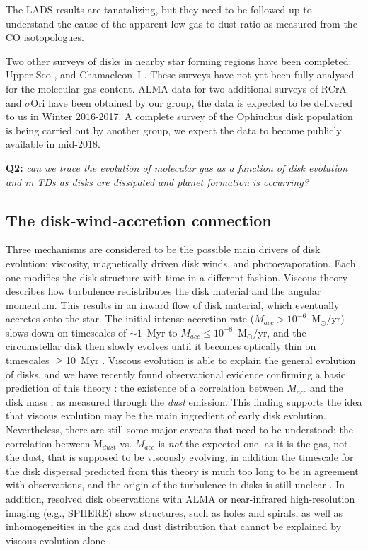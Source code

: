 \documentclass[10pt,fleqn,twoside]{article}
\begin{document}
The LADS results are tanatalizing, but they need to be followed up to understand the cause of the apparent low gas-to-dust ratio as measured from the CO isotopologues.

Two other surveys of disks in nearby star forming regions have been completed: Upper Sco \citep{2016ApJ...827..142B}, and Chamaeleon~I \citep{2016ApJ...831..125P}. These surveys have not yet been fully analysed for the molecular gas content. ALMA data for two additional surveys of RCrA and $\sigma$Ori have been obtained by our group, the data is expected to be delivered to us in Winter 2016-2017. A complete survey of the Ophiuchus disk population is being carried out by another group, we expect the data to become publicly available in mid-2018.

\smallskip
{\bf Q2:} {\it can we trace the evolution of molecular gas as a function of disk evolution and in TDs as disks are dissipated and planet formation is occurring?}

\subsection{The disk-wind-accretion connection}

Three mechanisms are considered to be the possible main drivers of disk evolution: viscosity,
magnetically driven disk winds, and photoevaporation. Each one modifies the disk structure with 
time in a different fashion. Viscous theory \citep[e.g.\ ][]{1974MNRAS.168..603L} describes how
turbulence redistributes the disk material and the angular momentum. This results in an inward 
flow of disk material, which eventually accretes onto the star. The initial intense accretion 
rate ($M_{acc}>10^{-6}$~M$_\odot$/yr)
slows down on timescales of $\sim 1$~Myr to $M_{acc}\le 10^{-8}$~M$_\odot$/yr,
and the circumstellar disk then slowly evolves until it 
becomes optically thin on timescales $\ge$10~Myr \citep[e.g.\ ][]{1998apsf.book.....H,2011MNRAS.410..671E}. Viscous 
evolution is able to explain the general evolution of disks, and we have recently found observational
evidence confirming a basic prediction of this theory \citep[e.g.\ ][]{2006ApJ...645L..69D}: the existence of a correlation between $M_{acc}$ 
and the disk mass \citep{2016A&A...591L...3M}, as measured through the {\it dust} emission. This 
finding supports the idea that viscous evolution may be the main ingredient of early disk evolution.
Nevertheless, there are still some major caveats that need to be understood:
the correlation between  M$_{dust}$ vs. $M_{acc}$ is {\it not} the expected one, as it is the gas,
not the dust, that is supposed to be viscously evolving, in addition
the timescale for the disk dispersal predicted from this theory is much too long to be in agreement with 
observations, and the origin of the turbulence in disks is still unclear 
\citep[e.g.\ ][]{2014prpl.conf..411T}. In addition, resolved disk observations with ALMA or 
near-infrared high-resolution imaging (e.g., SPHERE) show structures, such as holes and 
spirals, as well as inhomogeneities in the gas and dust distribution that cannot be 
explained by viscous evolution alone \citep[e.g.\ ][]{2015A&A...578L...6B}. 
\end{document}
